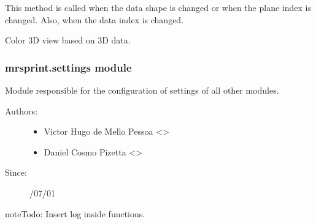 \documentclass[a4paper,10pt,english]{sphinxmanual}
\begin{document}
\begin{fulllineitems}
\begin{fulllineitems}
This method is called when the data shape is changed or when
the plane index is changed. Also, when the data index is changed.

\end{fulllineitems}


\begin{fulllineitems}
\label{\detokenize{autodoc/mrsprint/mrsprint:mrsprint.mainwindow.MainWindow.updateViewFromData3DView}}
Color 3D view based on 3D data.

\end{fulllineitems}


\end{fulllineitems}



\subsubsection{mrsprint.settings module}
\label{\detokenize{autodoc/mrsprint/mrsprint:module-mrsprint.settings}}\label{\detokenize{autodoc/mrsprint/mrsprint:mrsprint-settings-module}}
Module responsible for the configuration of settings of all other modules.
\begin{description}
\item[{Authors:}] \leavevmode\begin{itemize}
\item {} 
Victor Hugo de Mello Pessoa \textless{}\textgreater{}

\item {} 
Daniel Cosmo Pizetta \textless{}\textgreater{}

\end{itemize}

\item[{Since:}] /07/01

\end{description}

\begin{sphinxadmonition}{note}{\label{autodoc/mrsprint/mrsprint:index-3}Todo:}
Insert log inside functions.
\end{sphinxadmonition}
\end{document}
